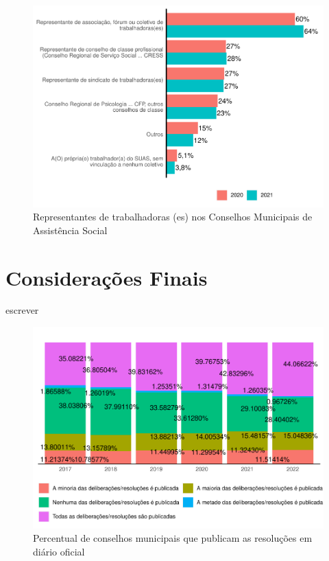 \documentclass[
  brazilian]{report}
\begin{document}
\begin{figure}
\includegraphics{Censo-SUAS-2022_files/figure-latex/trab_cmun-1} \caption[Representantes de trabalhadoras (es) nos Conselhos Municipais de Assistência Social]{Representantes de trabalhadoras (es) nos Conselhos Municipais de Assistência Social}\label{fig:trab_cmun}
\end{figure}

\hypertarget{considerauxe7uxf5es-finais-1}{%
\chapter{Considerações Finais}\label{considerauxe7uxf5es-finais-1}}

escrever

\begin{figure}
\includegraphics{Censo-SUAS-2022_files/figure-latex/pub_cmas-1} \caption[Percentual de conselhos municipais que publicam as resoluções em diário oficial]{Percentual de conselhos municipais que publicam as resoluções em diário oficial}\label{fig:pub_cmas}
\end{figure}
\end{document}

